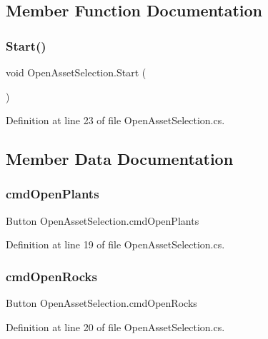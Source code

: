 \subsection{Member Function Documentation}
\mbox{\label{class_open_asset_selection_a7bc528e8050d4dfcc40fce7946295209}} 
\subsubsection{Start()}
{\footnotesize\ttfamily void Open\+Asset\+Selection.\+Start (\begin{DoxyParamCaption}{ }\end{DoxyParamCaption})}



Definition at line 23 of file Open\+Asset\+Selection.\+cs.



\subsection{Member Data Documentation}
\mbox{\label{class_open_asset_selection_a277c0467692e726b91c111fb3c4d3b7c}} 
\subsubsection{cmd\+Open\+Plants}
{\footnotesize\ttfamily Button Open\+Asset\+Selection.\+cmd\+Open\+Plants}



Definition at line 19 of file Open\+Asset\+Selection.\+cs.

\mbox{\label{class_open_asset_selection_aff8dfbc8a451e960701d239ee6fd3134}} 
\subsubsection{cmd\+Open\+Rocks}
{\footnotesize\ttfamily Button Open\+Asset\+Selection.\+cmd\+Open\+Rocks}



Definition at line 20 of file Open\+Asset\+Selection.\+cs.

